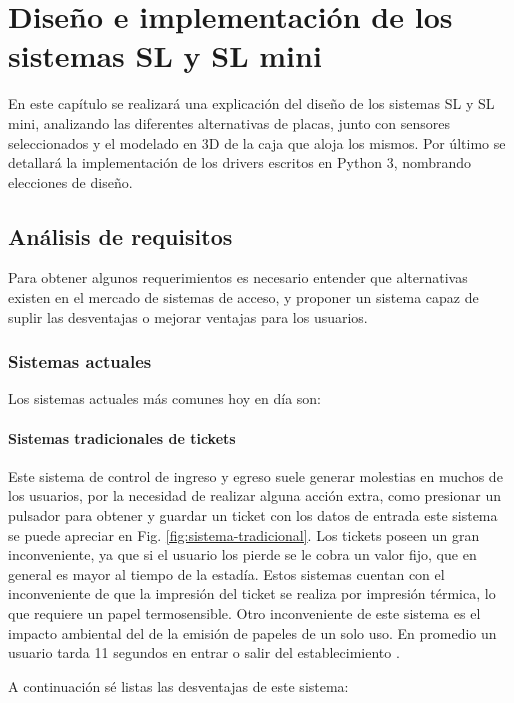 \chapter{Diseño e implementación de los sistemas SL y SL mini}

En este capítulo se realizará una explicación del diseño de los sistemas SL y SL mini, analizando las diferentes alternativas de placas, junto con sensores seleccionados y el modelado en 3D de la caja que aloja los mismos. Por último se detallará la implementación de los drivers escritos en Python 3, nombrando elecciones de diseño.

\section{Análisis de requisitos}

Para obtener algunos requerimientos es necesario entender que alternativas existen en el mercado de sistemas de acceso, y proponer un sistema capaz de suplir las desventajas o mejorar ventajas para los usuarios.

\subsection{Sistemas actuales}

Los sistemas actuales más comunes hoy en día son:

\subsubsection*{Sistemas tradicionales de tickets}

Este sistema de control de ingreso y egreso suele generar molestias en muchos de los usuarios, por la necesidad de realizar alguna acción extra, como presionar un pulsador para obtener y guardar un ticket con los datos de entrada este sistema se puede apreciar en Fig. \ref{fig:sistema-tradicional}.
Los tickets poseen un gran inconveniente, ya que si el usuario los pierde se le cobra un valor fijo, que en general es mayor al tiempo de la estadía.
Estos sistemas cuentan con el inconveniente de que la impresión del ticket se realiza por impresión térmica, lo que requiere un papel termosensible.
Otro inconveniente de este sistema es el impacto ambiental del de la emisión de papeles de un solo uso. En promedio un usuario tarda 11 segundos en entrar o salir del establecimiento \cite{casadomo_sistema_2015}.

A continuación sé listas las desventajas de este sistema:

